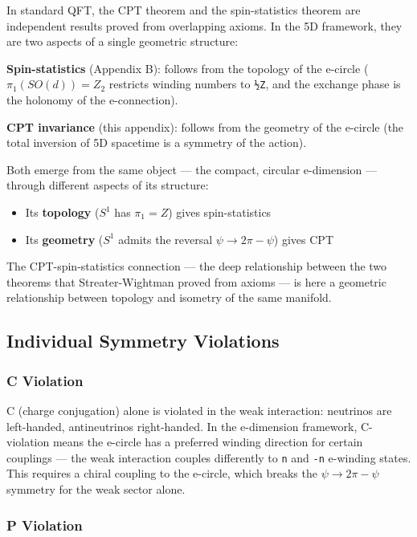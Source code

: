 \documentclass[aps,prd,preprint,superscriptaddress,longbibliography,floatfix]{revtex4-2}
\theoremstyle{remark}
\begin{document}
In standard QFT, the CPT theorem and the spin-statistics theorem are independent results proved from overlapping axioms. In the 5D framework, they are two aspects of a single geometric structure:

\textbf{Spin-statistics} (Appendix B): follows from the topology of the e-circle ($\pi_{1}(SO(d)) = Z_{2}$ restricts winding numbers to \texttt{½Z}, and the exchange phase is the holonomy of the e-connection).

\textbf{CPT invariance} (this appendix): follows from the geometry of the e-circle (the total inversion of 5D spacetime is a symmetry of the action).

Both emerge from the same object --- the compact, circular e-dimension --- through different aspects of its structure:

\begin{itemize}
  \item Its \textbf{topology} ($S^{1}$ has $\pi_{1} = Z$) gives spin-statistics
  \item Its \textbf{geometry} ($S^{1}$ admits the reversal $\psi \to 2\pi - \psi$) gives CPT
\end{itemize}

The CPT-spin-statistics connection --- the deep relationship between the two theorems that Streater-Wightman proved from axioms --- is here a geometric relationship between topology and isometry of the same manifold.



\subsection{Individual Symmetry Violations}


\subsubsection{C Violation}

C (charge conjugation) alone is violated in the weak interaction: neutrinos are left-handed, antineutrinos right-handed. In the e-dimension framework, C-violation means the e-circle has a preferred winding direction for certain couplings --- the weak interaction couples differently to \texttt{n} and \texttt{-n} e-winding states. This requires a chiral coupling to the e-circle, which breaks the $\psi \to 2\pi - \psi$ symmetry for the weak sector alone.


\subsubsection{P Violation}
\end{document}
